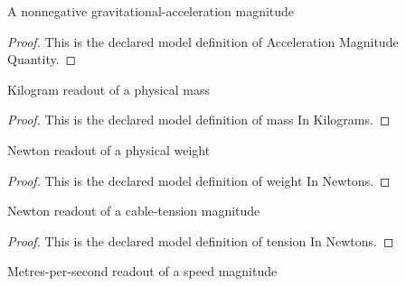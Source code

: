 \begin{definition}
  \label{def:physics:phyx-mini-0800:phyxminiproblems-problemphyxmini0800-accelerationmagnitudequantity}
  A nonnegative gravitational-acceleration magnitude
\end{definition}
\begin{proof}
  This is the declared model definition of Acceleration Magnitude Quantity.
\end{proof}
\begin{definition}
  \label{def:physics:phyx-mini-0800:phyxminiproblems-problemphyxmini0800-massinkilograms}
  Kilogram readout of a physical mass
\end{definition}
\begin{proof}
  This is the declared model definition of mass In Kilograms.
\end{proof}
\begin{definition}
  \label{def:physics:phyx-mini-0800:phyxminiproblems-problemphyxmini0800-weightinnewtons}
  Newton readout of a physical weight
\end{definition}
\begin{proof}
  This is the declared model definition of weight In Newtons.
\end{proof}
\begin{definition}
  \label{def:physics:phyx-mini-0800:phyxminiproblems-problemphyxmini0800-tensioninnewtons}
  Newton readout of a cable-tension magnitude
\end{definition}
\begin{proof}
  This is the declared model definition of tension In Newtons.
\end{proof}
\begin{definition}
  \label{def:physics:phyx-mini-0800:phyxminiproblems-problemphyxmini0800-speedinmeterspersecond}
  Metres-per-second readout of a speed magnitude
\end{definition}
